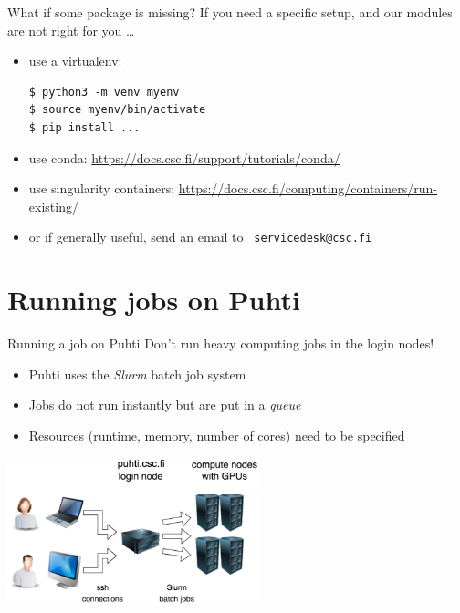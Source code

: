 \documentclass[aspectratio=1610,14pt]{beamer}
\newcommand{\link}[1]{\alert{\url{#1}}}
\newcommand{\vitem}{\vfill\item}
\begin{document}
\begin{frame}[fragile]{What if some package is missing?}
  If you need a specific setup, and our modules are not right for you \ldots
  \begin{itemize}
  \vitem use a virtualenv:
\begin{verbatim}
$ python3 -m venv myenv
$ source myenv/bin/activate
$ pip install ...
\end{verbatim}

  \vitem use conda: {\small \link{https://docs.csc.fi/support/tutorials/conda/}}
  \vitem use singularity containers: {\small \link{https://docs.csc.fi/computing/containers/run-existing/}}
    
  \vitem or if generally useful, send an email to \alert{\tt
      servicedesk@csc.fi}
  \end{itemize}
  
\end{frame}

\section{Running jobs on Puhti}

\begin{frame}{Running a job on Puhti}
  \alert{Don't run heavy computing jobs in the login nodes!}
  \vspace{2mm}
  \begin{itemize}
  \item Puhti uses the \emph{Slurm} batch job system
  \item Jobs do not run instantly but are put in a \emph{queue}
  \item Resources (runtime, memory, number of cores) need to be specified
  \end{itemize}

  \vspace{-4mm}
  \begin{center}
    \includegraphics[width=0.55\textwidth]{slurm1.png}    
  \end{center}
\end{frame}
\end{document}
